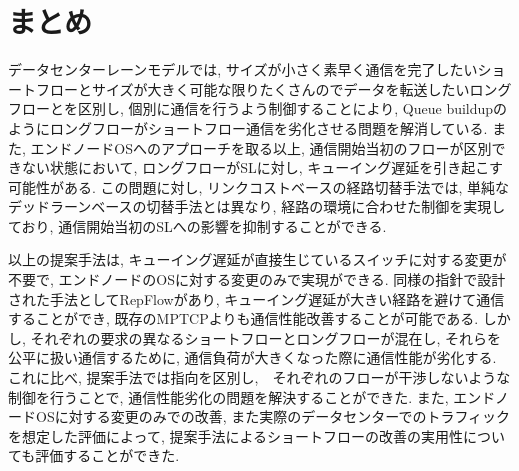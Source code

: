\section{まとめ}
データセンターレーンモデルでは,
サイズが小さく素早く通信を完了したいショートフローとサイズが大きく可能な限りたくさんのでデータを転送したいロングフローとを区別し,
個別に通信を行うよう制御することにより, Queue buildupのようにロングフローがショートフロー通信を劣化させる問題を解消している. 
また, エンドノードOSへのアプローチを取る以上, 通信開始当初のフローが区別できない状態において, ロングフローがSLに対し,
キューイング遅延を引き起こす可能性がある.
この問題に対し, リンクコストベースの経路切替手法では, 単純なデッドラーンベースの切替手法とは異なり, 経路の環境に合わせた制御を実現しており,
通信開始当初のSLへの影響を抑制することができる. 

以上の提案手法は, キューイング遅延が直接生じているスイッチに対する変更が不要で, エンドノードのOSに対する変更のみで実現ができる. 
同様の指針で設計された手法としてRepFlowがあり, キューイング遅延が大きい経路を避けて通信することができ,
既存のMPTCPよりも通信性能改善することが可能である. 
しかし, それぞれの要求の異なるショートフローとロングフローが混在し, それらを公平に扱い通信するために, 通信負荷が大きくなった際に通信性能が劣化する. 
これに比べ, 提案手法では指向を区別し,　それぞれのフローが干渉しないような制御を行うことで, 通信性能劣化の問題を解決することができた. 
また, エンドノードOSに対する変更のみでの改善, また実際のデータセンターでのトラフィックを想定した評価によって,
提案手法によるショートフローの改善の実用性についても評価することができた. 

